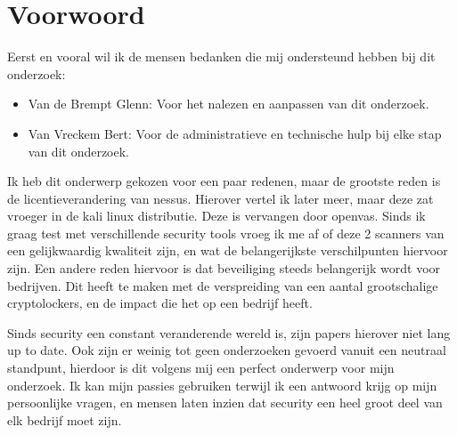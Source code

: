 
\chapter*{Voorwoord}
\label{ch:voorwoord}


Eerst en vooral wil ik de mensen bedanken die mij ondersteund hebben bij dit onderzoek: 
\begin{itemize}
\item Van de Brempt Glenn:	Voor het nalezen en aanpassen van dit onderzoek.
\item Van Vreckem Bert: 	Voor de administratieve en technische hulp bij elke stap van dit onderzoek.
\end{itemize}

Ik heb dit onderwerp gekozen voor een paar redenen, maar de grootste reden is de licentieverandering van nessus. Hierover vertel ik later meer, maar deze zat vroeger in de kali linux distributie. Deze is vervangen door openvas. Sinds ik graag test met verschillende security tools vroeg ik me af of deze 2 scanners van een gelijkwaardig kwaliteit zijn, en wat de belangerijkste verschilpunten hiervoor zijn.  Een andere reden hiervoor is dat beveiliging steeds belangerijk wordt voor bedrijven. Dit heeft te maken met de verspreiding van een aantal grootschalige cryptolockers, en de impact die het op een bedrijf heeft.

Sinds security een constant veranderende wereld is, zijn papers hierover niet lang up to date. Ook zijn er weinig tot geen onderzoeken gevoerd vanuit een neutraal standpunt, hierdoor is dit volgens mij een perfect onderwerp voor mijn onderzoek. Ik kan mijn passies gebruiken terwijl ik een antwoord krijg op mijn persoonlijke vragen, en mensen laten inzien dat security een heel groot deel van elk bedrijf moet zijn. 
